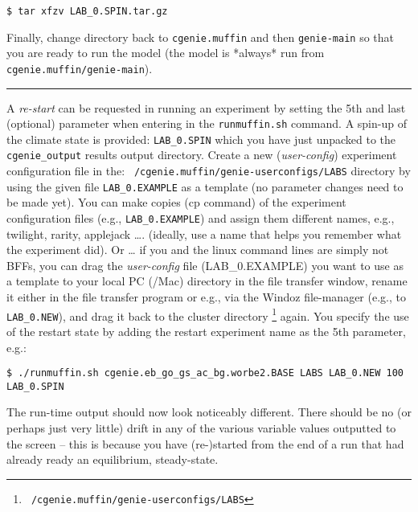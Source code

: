 \documentclass[11pt,fleqn]{book} %
\begin{document}
\vspace{-2mm}
\begin{verbatim}
$ tar xfzv LAB_0.SPIN.tar.gz
\end{verbatim}
\vspace{-2mm}

Finally, change directory back to \texttt{cgenie.muffin} and then \texttt{genie-main} so that you are ready to run the model (the model is *always* run from \texttt{cgenie.muffin/genie-main}).

\vspace{1mm}
\noindent\rule{4cm}{0.1mm}
\vspace{2mm}

\noindent A \textit{re-start} can be requested in running an experiment by setting the 5th and last (optional) parameter when entering in the \texttt{runmuffin.sh} command. A spin-up of the climate state is provided: \texttt{LAB\_0.SPIN} which you have just unpacked to the \texttt{cgenie\_output} results output directory.
Create a new (\textit{user-config}) experiment configuration file in the: \linebreak \texttt{~/cgenie.muffin/genie-userconfigs/LABS} directory by using the given file \texttt{LAB\_0.EXAMPLE} as a template (no parameter changes need to be made yet). You can make copies (cp command) of the experiment configuration files (e.g., \texttt{LAB\_0.EXAMPLE}) and assign them different names, e.g., twilight, rarity, applejack …. (ideally, use a name that helps you remember what the experiment did). Or … if you and the linux command lines are simply not BFFs, you can drag the \textit{user-config} file (\textsf{\footnotesize LAB\_0.EXAMPLE}) you want to use as a template to your local PC (/Mac) directory in the file transfer window, rename it either in the file transfer program or e.g., via the Windoz file-manager (e.g., to \texttt{LAB\_0.NEW}), and drag it back to the cluster directory \footnote{\texttt{~/cgenie.muffin/genie-userconfigs/LABS}} again.
You specify the use of the restart state by adding the restart experiment name as the 5th parameter, e.g.:

\vspace{-2mm}
\small\begin{verbatim}
$ ./runmuffin.sh cgenie.eb_go_gs_ac_bg.worbe2.BASE LABS LAB_0.NEW 100 LAB_0.SPIN
\end{verbatim}\normalsize
\vspace{-2mm}

The run-time output should now look noticeably different. There should be no (or perhaps just very little) drift in any of the various variable values outputted to the screen – this is because you have (re-)started from the end of a run that had already ready an equilibrium, steady-state.
\end{document}
